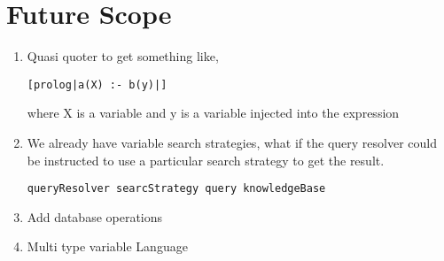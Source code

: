 \documentclass[thesis-solanki.tex]{subfiles}
\begin{document}
\chapter{Future Scope}\label{chap:futureScope}

\begin{enumerate}

\item Quasi quoter to get something like,
\begin{verbatim}
[prolog|a(X) :- b(y)|]
\end{verbatim}
where X is a   variable and y is a  variable injected into the expression


\item We already have variable search strategies, what if the query resolver could be instructed to use a particular search strategy to get 
the result.
\begin{verbatim}
queryResolver searcStrategy query knowledgeBase
\end{verbatim}


\item Add database operations

\item Multi type variable Language



\end{enumerate}
\end{document}
